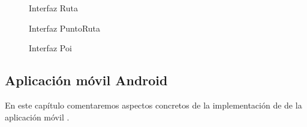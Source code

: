 \begin{figure}[H]
\begin{minipage}[b]{0.5\linewidth}
\centering
{}
\caption{ Interfaz Ruta}
\label{fig:Ruta}
\end{minipage}
\begin{minipage}[b]{0.5\linewidth}
\centering
{}
\caption{ Interfaz PuntoRuta}
\label{fig:PuntoRuta}
\end{minipage}
\end{figure}




\begin{figure}[H]
\begin{minipage}[b]{0.5\linewidth}
\centering
{}
\caption{ Interfaz Poi}
\label{fig:Poi}
\end{minipage}
\end{figure}














\newpage

 
 
 
 
 \subsection{Aplicación móvil Android}
En este capítulo comentaremos aspectos concretos de la implementación de de la aplicación móvil \cite{8}.



